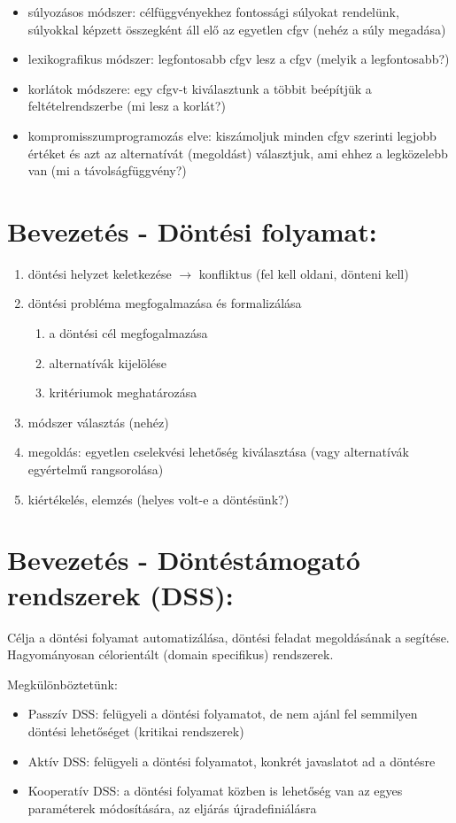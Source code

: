 \documentclass[a4paper,12pt]{article}
\begin{document}
\begin{itemize}
\item súlyozásos módszer: célfüggvényekhez fontossági súlyokat rendelünk, súlyokkal képzett összegként áll elő az egyetlen cfgv (nehéz a súly megadása)  
\item lexikografikus módszer: legfontosabb cfgv lesz a cfgv (melyik a legfontosabb?)
\item korlátok módszere: egy cfgv-t kiválasztunk a többit beépítjük a feltételrendszerbe (mi lesz a korlát?)
\item kompromisszumprogramozás elve: kiszámoljuk minden cfgv szerinti legjobb értéket és azt az alternatívát (megoldást) választjuk, ami ehhez a legközelebb van (mi a távolságfüggvény?)
\end{itemize}


\section{Bevezetés - Döntési folyamat:}

\begin{enumerate}

\item döntési helyzet keletkezése $\rightarrow$ konfliktus (fel kell oldani, dönteni kell)
\item döntési probléma megfogalmazása és formalizálása
	\begin{enumerate}
	\item a döntési cél megfogalmazása
	\item alternatívák kijelölése
	\item kritériumok meghatározása
	\end{enumerate}
\item módszer választás (nehéz)
\item megoldás: egyetlen cselekvési lehetőség kiválasztása (vagy alternatívák egyértelmű rangsorolása)
\item kiértékelés, elemzés (helyes volt-e a döntésünk?)
\end{enumerate}

\section{Bevezetés - Döntéstámogató rendszerek (DSS):} Célja a döntési folyamat automatizálása, döntési feladat megoldásának a segítése. Hagyományosan célorientált (domain specifikus) rendszerek.

Megkülönböztetünk:
\begin{itemize}
\item Passzív DSS: felügyeli a döntési folyamatot, de nem ajánl fel semmilyen döntési lehetőséget (kritikai rendszerek)
\item Aktív DSS: felügyeli a döntési folyamatot, konkrét javaslatot ad a döntésre
\item Kooperatív DSS: a döntési folyamat közben is lehetőség van az egyes paraméterek módosítására, az eljárás újradefiniálásra
\end{itemize}
\end{document}
